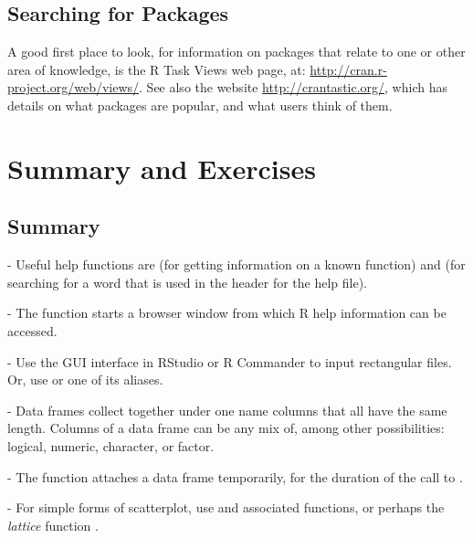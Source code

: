 \subsection*{Searching for Packages}

A good first place to look, for information on packages that relate to
one or other area of knowledge, is the R Task Views web page, at:
\url{http://cran.r-project.org/web/views/}. See also the website
\url{http://crantastic.org/}, which has details on what packages are
popular, and what users think of them.


\section{Summary and Exercises}

\subsection{Summary}
\begin{itemizz}
\item[-] Useful help functions
are  (for getting information on a known function)
and  (for searching for a word that is used
in the header for the help file).

\item[-] The function  starts a browser window from
  which R help information can be accessed.

\item[-]
Use the GUI interface in RStudio or R Commander to input
rectangular files.  Or, use  or one
of its aliases.

\item[-] Data frames collect together under one name columns that all
  have the same length.  Columns of a data frame can be any mix of,
  among other possibilities: logical, numeric, character, or factor.

\item[-] The function  attaches a data frame temporarily,
  for the duration of the call to .

\item[-] For simple forms of scatterplot, use  and associated
functions, or perhaps the {\em lattice} function .

\end{itemizz}

